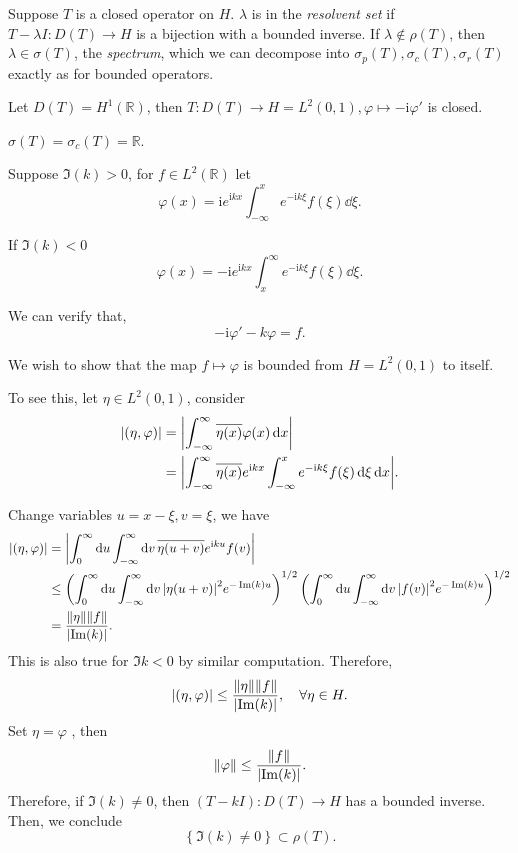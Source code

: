 \documentclass[a4paper,11pt]{article}
\begin{document}
	Suppose $T$ is a closed operator on $H$. $\lambda$ is in the \emph{resolvent set} if $T - \lambda I : D(T) \to H$ is a bijection with a bounded inverse. If $\lambda \not \in \rho(T)$, then $\lambda \in \sigma(T)$, the \emph{spectrum}, which we can decompose into $\sigma_p(T), \sigma_c (T), \sigma_r(T)$ exactly as for bounded operators.

	\begin{ex}
		Let $D(T) = H^1(\mathbb{R})$, then $T: D(T) \to H = L^2(0,1), \varphi \mapsto - \mathrm{i} \varphi'$ is closed.

		\begin{clm}
			$\sigma(T) = \sigma_c(T) = \mathbb{R}$.
		\end{clm}

		Suppose $\Im(k) > 0$, for $f \in L^2(\mathbb{R})$ let
		\[
			\varphi(x) = \mathrm{i} e ^{\mathrm{i} kx} \int_{-\infty}^{x}e ^{-\mathrm{i} k \xi}f(\xi) \dd{\xi}.
		\]
		
		If $\Im(k) < 0$ 
		\[
			\varphi(x) = -\mathrm{i} e ^{\mathrm{i} kx} \int_{x}^{\infty}e ^{-\mathrm{i} k \xi}f(\xi) \dd{\xi}.
		\]

		We can verify that, $$- \mathrm{i} \varphi' - k \varphi = f.$$

		We wish to show that the map $f \mapsto \varphi$ is bounded from $H = L^2(0,1)$ to itself.

		To see this, let $\eta \in L^2(0,1)$, consider 
		\begin{align*}
			\abs{(\eta, \varphi)} &= \abs{\int_{-\infty}^{\infty} \overline{\eta (x)} \varphi(x) \dd{x}}\\
			& = \abs{\int_{-\infty}^{\infty} \overline{\eta(x)} e ^{\mathrm{i} kx} \int_{-\infty}^{x} e ^{-\mathrm{i} k \xi} f(\xi) \dd{\xi} \dd{x}}.
		\end{align*}
		
		Change variables $u = x - \xi, v = \xi$, we have
		\begin{align*}
			\abs{(\eta, \varphi)} &= \abs{\int_{0}^{\infty}\dd{u}\int_{-\infty}^{\infty} \dd{v} \overline{\eta (u + v)} e ^{\mathrm{i} ku} f(v)}\\
			& \leq \left( \int_{0}^{\infty}\dd{u}\int_{-\infty}^{\infty} \dd{v} \abs{\eta(u+v)}^2 e ^{-\Im(k)u} \right)^{1/2} \left( \int_{0}^{\infty}\dd{u}\int_{-\infty}^{\infty} \dd{v} \abs{f(v)}^2 e ^{-\Im(k)u} \right)^{1/2}\\
			& = \frac{\norm{\eta}\norm{f}}{\abs{\Im(k)}}.
		\end{align*}
		This is also true for $\Im k < 0$ by similar computation. Therefore,
		\[
			\abs{(\eta,\varphi)} \leq \frac{\norm{\eta}\norm{f}}{\abs{\Im(k)}}, \quad \forall \eta \in H.
		\]
		Set $\eta = \varphi$ , then
		\[
			\norm{\varphi} \leq \frac{\norm{f}}{\abs{\Im(k)}}.
		\]
		Therefore, if $\Im(k) \neq 0$, then $(T - kI) : D(T) \to H$ has a bounded inverse. Then, we conclude 
		\[
			\left\{ \Im(k) \neq 0 \right\} \subset \rho(T).
		\]
		

\end{ex}
\end{document}
